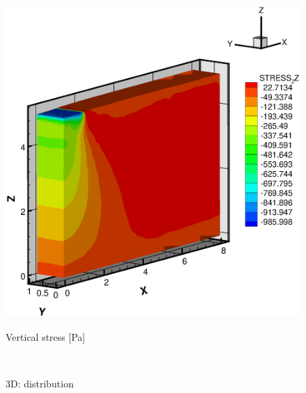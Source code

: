 \begin{figure}[!htb]
\begin{center}
\begin{minipage}[t]{0.4\textwidth}
\begin{center}
    \includegraphics[scale=0.25]{HM/HM3D/stress3d_yy.eps}\\
    \centerline{Vertical stress [Pa]}
    \end{center}
   \end{minipage}\\
  \end{center}
  \caption{3D: distribution}
  \label{fig:e12}
\end{figure}
